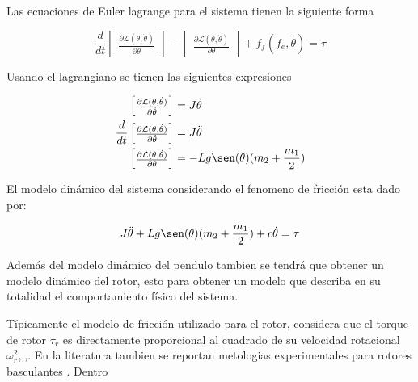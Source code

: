 \documentclass[a4paper]{IEEEtran} %
\begin{document}
Las ecuaciones de Euler lagrange para el sistema tienen la siguiente forma

\begin{equation}
    \frac{d}{dt}\begin{bmatrix}
        \frac{\partial \mathcal{L}(\theta,\dot{\theta})}{\partial\dot{\theta}}
    \end{bmatrix}-\begin{bmatrix}
        \frac{\partial \mathcal{L}(\theta,\dot{\theta})}{\partial \theta}
    \end{bmatrix}+f_f(f_e,\dot{\theta})=\tau
    \label{eq:eu_lagran}
\end{equation}

Usando el lagrangiano se tienen las siguientes expresiones

\begin{equation}
    \begin{split}
        \begin{bmatrix}
            \frac{\partial \mathcal{L}(\theta,\dot{\theta})}{\partial\dot{\theta}}
        \end{bmatrix}&=J\dot{\theta}\\
        \frac{d}{dt}\begin{bmatrix}
            \frac{\partial\mathcal{L}(\theta,\dot{\theta})}{\partial\dot{\theta}}
        \end{bmatrix}&=J\ddot{\theta}\\
        \begin{bmatrix}
            \frac{\partial \mathcal{L}(\theta,\dot{\theta})}{\partial \theta}
        \end{bmatrix}&=-Lg\sen(\theta)(m_2 + \frac{m_1}{2})\\
    \end{split}
    \label{eq:dq}
\end{equation}

El modelo dinámico del sistema considerando el fenomeno de fricción esta dado por:

\begin{equation}
    J\ddot{\theta}+Lg\sen(\theta)(m_2+\frac{m_1}{2})+c\dot{\theta}=\tau
    \label{eq:din_model}
\end{equation}

Además del modelo dinámico del pendulo tambien se tendrá que obtener un modelo dinámico del rotor, esto para obtener un modelo que describa en su totalidad el comportamiento físico del sistema.

Típicamente el modelo de fricción utilizado para el rotor, considera que el torque de rotor $\tau_r$ es directamente proporcional al cuadrado de su velocidad rotacional $\omega^2_r$\cite{nemati2014modeling},\cite{schulz2015high},\cite{koehl2012aerodynamic},\cite{mellinger2012trajectory}. En la literatura tambien se reportan metologias experimentales para rotores basculantes \cite{gill2017propeller}. Dentro





\end{document}
